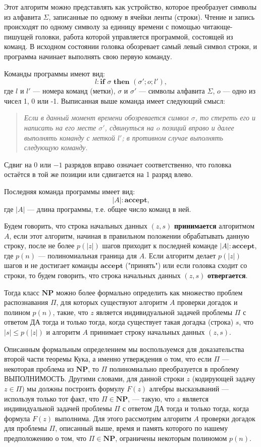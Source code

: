 \documentclass[a4paper,12pt]{article}
\begin{document}
Этот алгоритм можно представлять как устройство, которое преобразует символы из алфавита \(\Sigma\), записанные по одному в ячейки ленты (строки). Чтение и запись происходят по одному символу за единицу времени с помощью читающе-пишущей головки, работа которой управляется программой, состоящей из команд. В исходном состоянии головка обозревает самый левый символ строки, и программа начинает выполнять свою первую команду.

Команды программы имеют вид:
\[
l: \textbf{if } \sigma \textbf{ then } (\sigma'; o; l'),
\]
где \(l\) и \(l'\) --- номера команд (метки), \(\sigma\) и \(\sigma'\) --- символы алфавита \(\Sigma\), \(o\) --- одно из чисел 1, 0 или -1. Выписанная выше команда имеет следующий смысл:
\begin{quote}
\textit{Если в данный момент времени обозревается символ \(\sigma\), то стереть его и написать на его месте \(\sigma'\), сдвинуться на \(o\) позиций вправо и далее выполнять команду с меткой \(l'\); в противном случае выполнять следующую команду.}
\end{quote}
Сдвиг на 0 или \(-1\) разрядов вправо означает соответственно, что головка остаётся в той же позиции или сдвигается на 1 разряд влево.

Последняя команда программы имеет вид:
\[
|A|: \textbf{accept},
\]
где \(|A|\) --- длина программы, т.е. общее число команд в ней.

Будем говорить, что строка начальных данных \((z, s)\) \textbf{принимается} алгоритмом \(A\), если этот алгоритм, начиная в правильном положении обрабатывать данную строку, после не более \(p(|z|)\) шагов приходит к последней команде \(|A|: \textbf{accept}\), где \(p(n)\) --- полиномиальная граница для \(A\). Если алгоритм делает \(p(|z|)\) шагов и не достигает команды \(\textbf{accept}\) ("принять") или если головка сходит со строки, то будем говорить, что строка начальных данных \((z, s)\) \textbf{отвергается}.

Тогда класс \(\mathbf{NP}\) можно более формально определить как множество проблем распознавания \(\Pi\), для которых существуют алгоритм \(A\) проверки догадок и полином \(p(n)\), такие, что \(z\) является индивидуальной задачей проблемы \(\Pi\) с ответом ДА тогда и только тогда, когда существует такая догадка (строка) \(s\), что \(|s| \le p(|z|)\) и алгоритм \(A\) принимает строку начальных данных \((z, s)\).

Описанным формальным определением мы воспользуемся для доказательства второй части теоремы Кука, а именно утверждения о том, что если \(\Pi\) --- некоторая проблема из \(\mathbf{NP}\), то \(\Pi\) полиномиально преобразуется в проблему ВЫПОЛНИМОСТЬ. Другими словами, для данной строки \(z\) (кодирующей задачу \(z \in \Pi\)) мы должны построить формулу \(F(z)\) алгебры высказываний --- используя только тот факт, что \(\Pi \in \mathbf{NP}\), --- такую, что \(z\) является индивидуальной задачей проблемы \(\Pi\) с ответом ДА тогда и только тогда, когда формула \(F(z)\) выполнима. Для этого рассмотрим алгоритм \(A\) проверки догадок для проблемы \(\Pi\), описанный выше, время и память которого по нашему предположению о том, что \(\Pi \in \mathbf{NP}\), ограничены некоторым полиномом \(p(n)\).
\end{document}
